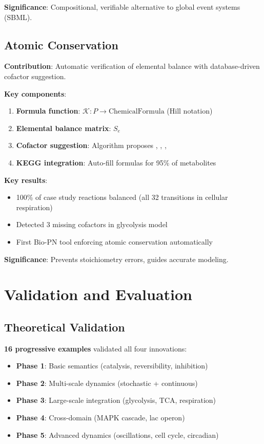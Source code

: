 \textbf{Significance}: Compositional, verifiable alternative to global event systems (SBML).

\subsection{Atomic Conservation}
\label{subsec:atomic-summary}

\textbf{Contribution}: Automatic verification of elemental balance with database-driven cofactor suggestion.

\textbf{Key components}:
\begin{enumerate}
    \item \textbf{Formula function}: $\mathcal{K}: P \to \text{ChemicalFormula}$ (Hill notation)
    \item \textbf{Elemental balance matrix}: $S_e$
    \item \textbf{Cofactor suggestion}: Algorithm proposes , , , 
    \item \textbf{KEGG integration}: Auto-fill formulas for 95\% of metabolites
\end{enumerate}

\textbf{Key results}:
\begin{itemize}
    \item 100\% of case study reactions balanced (all 32 transitions in cellular respiration)
    \item Detected 3 missing cofactors in glycolysis model
    \item First Bio-PN tool enforcing atomic conservation automatically
\end{itemize}

\textbf{Significance}: Prevents stoichiometry errors, guides accurate modeling.

\section{Validation and Evaluation}
\label{sec:validation-eval}

\subsection{Theoretical Validation}
\label{subsec:theory-validation}

\textbf{16 progressive examples} validated all four innovations:
\begin{itemize}
    \item \textbf{Phase 1}: Basic semantics (catalysis, reversibility, inhibition)
    \item \textbf{Phase 2}: Multi-scale dynamics (stochastic + continuous)
    \item \textbf{Phase 3}: Large-scale integration (glycolysis, TCA, respiration)
    \item \textbf{Phase 4}: Cross-domain (MAPK cascade, lac operon)
    \item \textbf{Phase 5}: Advanced dynamics (oscillations, cell cycle, circadian)
\end{itemize}

